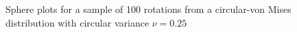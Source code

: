 \documentclass[12pt]{article}
\begin{document}
\begin{figure}
\centering
{}
\caption{\label{fig:eye-vmises}Sphere plots for a sample of 100 rotations from a circular-von Mises distribution with circular variance $\nu=0.25$}
\end{figure}
\end{document}
